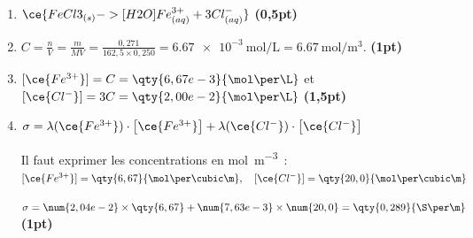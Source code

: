 \begin{enumerate}
    \item $\ce{FeCl3_{(s)} ->[H2O] Fe^{3+}_{(aq)} + 3Cl^-_{(aq)}}$
          \hfill\textbf{(0,5pt)}

    \item $C=\frac{n}{V}=\frac{m}{MV}=\frac{0,271}{162,5\times0,250}=
          \qty{6,67e-3}{\mol\per\L}=\qty{6,67}{\mol\per\cubic\m}$.
          \hfill\textbf{(1pt)}

    \item $[\ce{Fe^{3+}}]=C=\qty{6,67e-3}{\mol\per\L}$ \quad et \quad
          $[\ce{Cl^-}]=3C=\qty{2,00e-2}{\mol\per\L}$
          \hfill\textbf{(1,5pt)}

    \item $\sigma=\lambda(\ce{Fe^{3+}})\cdot\bigl[\ce{Fe^{3+}}\bigr]+
          \lambda(\ce{Cl^-})\cdot\bigl[\ce{Cl^-}\bigr]$

          Il faut exprimer les concentrations en \unit{\mol\per\cubic\m}~:
          $[\ce{Fe^{3+}}]=\qty{6,67}{\mol\per\cubic\m}, \quad
           [\ce{Cl^-}]=\qty{20,0}{\mol\per\cubic\m}$

          $\sigma=\num{2,04e-2}\times\qty{6,67}+\num{7,63e-3}\times\num{20,0}=
          \qty{0,289}{\S\per\m}$
          \hfill\textbf{(1pt)}
\end{enumerate}
